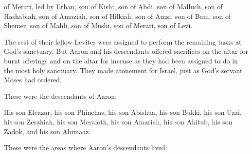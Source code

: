 {of Merari,
led by Ethan,
son
of Kishi,
son
of Abdi,
son
of Malluch,
son
of Hashabiah,
son
of Amaziah,
son
of Hilkiah,
son
of Amzi,
son
of Bani,
son
of Shemer,
son
of Mahli,
son
of Mushi,
son
of Merari,
son
of Levi.
\par }{\PP {}The rest of their fellow
Levites
were assigned
to perform the remaining
tasks
at God’s
sanctuary.
But Aaron
and his descendants
offered
sacrifices on
the altar
for burnt offerings
and on
the altar
for incense
as they had been assigned
to do in the most holy
sanctuary.
They made atonement
for Israel,
just
as God’s
servant
Moses
had ordered.
\par }{\PP {}These
were the descendants
of Aaron:
\par }{\PP His son
Eleazar,
his son
Phinehas,
his son
Abishua,
his son
Bukki,
his son
Uzzi,
his son
Zerahiah,
his son Meraioth,
his son
Amariah,
his son
Ahitub,
his son
Zadok,
and his son
Ahimaaz.
\par }{\PP {}These
were the areas where
Aaron’s
descendants
lived:

}

